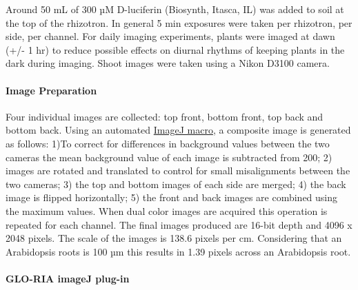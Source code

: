 \documentclass[]{article}
\begin{document}
Around 50 mL of 300 µM D-luciferin (Biosynth, Itasca, IL) was added to
soil at the top of the rhizotron. In general 5 min exposures were taken
per rhizotron, per side, per channel. For daily imaging experiments,
plants were imaged at dawn (+/- 1 hr) to reduce possible effects on
diurnal rhythms of keeping plants in the dark during imaging. Shoot
images were taken using a Nikon D3100 camera.

\paragraph{Image Preparation}\label{image-preparation}

Four individual images are collected: top front, bottom front, top back
and bottom back. Using an automated
\href{https://github.com/rr-lab/GLO-Roots/blob/master/gloria/gloroot_combine.ijm}{ImageJ
macro}, a composite image is generated as follows: 1)To correct for
differences in background values between the two cameras the mean
background value of each image is subtracted from 200; 2) images are
rotated and translated to control for small misalignments between the
two cameras; 3) the top and bottom images of each side are merged; 4)
the back image is flipped horizontally; 5) the front and back images are
combined using the maximum values. When dual color images are acquired
this operation is repeated for each channel. The final images produced
are 16-bit depth and 4096 x 2048 pixels. The scale of the images is
138.6 pixels per cm. Considering that an Arabidopsis roots is 100 µm
this results in 1.39 pixels across an Arabidopsis root.

\paragraph{GLO-RIA imageJ plug-in}\label{glo-ria-imagej-plug-in}
\end{document}
